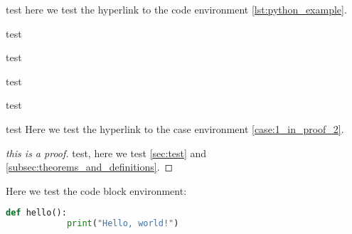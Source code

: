     \begin{corollary}
        test here we test the hyperlink to the code environment \cref{lst:python_example}.
    \end{corollary}
    \begin{question}
        test
    \end{question}
    \begin{conjecture}
        test
    \end{conjecture}

    \begin{example}
        test 
    \end{example}
    \begin{exercise}
        test
    \end{exercise}
    \begin{remark}
        test
        Here we test the hyperlink to the case environment \cref{case:1_in_proof_2}.
    \end{remark}
    \begin{proof}[this is a proof]
        test, here we test \cref{sec:test} and \cref{subsec:theorems_and_definitions}.
    \end{proof}

    Here we test the code block environment:
    \begin{lstlisting}[language=Python, caption=Python code example, label=lst:python_example]
        def hello():
            print("Hello, world!")
    \end{lstlisting}

    


